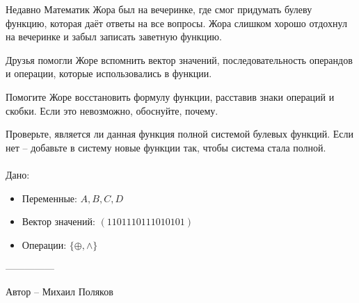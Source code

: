 \question
Недавно Математик Жора был на вечеринке, где смог придумать булеву функцию, которая даёт ответы на все вопросы. Жора слишком хорошо отдохнул на вечеринке и забыл записать заветную функцию.

Друзья помогли Жоре вспомнить вектор значений, последовательность операндов и операции, которые использовались в функции.

Помогите Жоре восстановить формулу функции, расставив знаки операций и скобки. Если это невозможно, обоснуйте, почему.

Проверьте, является ли данная функция полной системой булевых функций. Если нет -- добавьте в систему новые функции так, чтобы система стала полной.
\\
\\
Дано:
\begin{itemize}
\item Переменные: $A, B, C, D$
\item Вектор значений: $(1101110111010101)$
\item Операции: $\{\oplus, \land\}$
\end{itemize}

---------------

Автор -- Михаил Поляков